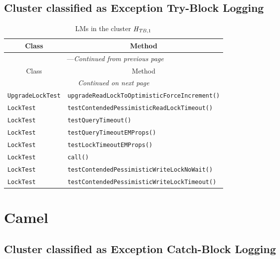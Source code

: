 \subsection{Cluster classified as Exception Try-Block Logging}

\begin{center}
\begin{longtable}{ll}
\caption{LMs in the cluster $\mathit{H}_{\mathit{TB},1}$}\\
\toprule\multicolumn{1}{c}{Class}&\multicolumn{1}{c}{Method}\\\midrule
\endfirsthead

\multicolumn{2}{c}{\tablename\ \thetable{}---\textit{Continued from previous page}} \\\midrule
\multicolumn{1}{c}{Class}&\multicolumn{1}{c}{Method}\\\midrule
\endhead
\multicolumn{2}{c}{\textit{Continued on next page}}\\\midrule
\endfoot
\bottomrule
\endlastfoot

\lstinline/UpgradeLockTest/&{\lstinline/upgradeReadLockToOptimisticForceIncrement()/}\\
\lstinline/LockTest/&{\lstinline/testContendedPessimisticReadLockTimeout()/}\\
\lstinline/LockTest/&{\lstinline/testQueryTimeout()/}\\
\lstinline/LockTest/&{\lstinline/testQueryTimeoutEMProps()/}\\
\lstinline/LockTest/&{\lstinline/testLockTimeoutEMProps()/}\\
\lstinline/LockTest/&{\lstinline/call()/}\\
\lstinline/LockTest/&{\lstinline/testContendedPessimisticWriteLockNoWait()/}\\
\lstinline/LockTest/&{\lstinline/testContendedPessimisticWriteLockTimeout()/}\\

\end{longtable}
\end{center}

\section{Camel}\label{camel}

\subsection{Cluster classified as Exception Catch-Block Logging}

